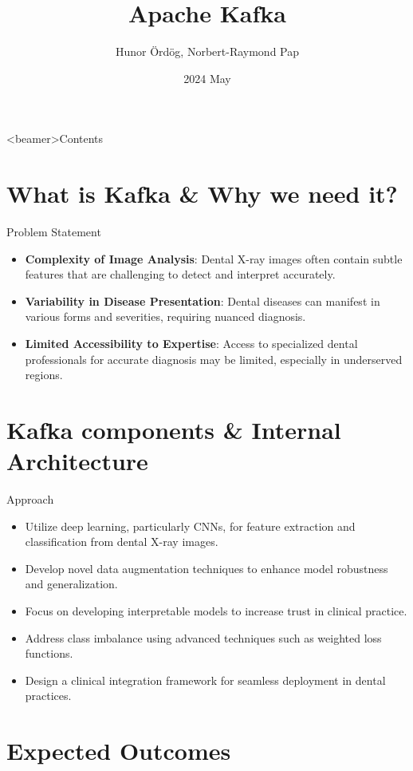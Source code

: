 \documentclass{beamer}
\title[Apache Kafka]{Apache Kafka}
\author{ Hunor Ördög, Norbert-Raymond Pap}
\institute[UBB Cluj-Napoca]{
  Department of Mathematics and Informatics\\
  Babe{\c{s}}--Bolyai University, Cluj-Napoca}
\date{2024 May}
\begin{document}
\frame{\maketitle}

{

  {
      \begin{frame}<beamer>{Contents}
        \tableofcontents
      \end{frame}
    }
}

\section[What is Kafka \& Why we need it?]{What is Kafka \& Why we need it?}

\begin{frame}{Problem Statement}
  \begin{itemize}
    \item \textbf{Complexity of Image Analysis}: Dental X-ray images often contain subtle features
          that are challenging to detect and interpret accurately.
    \item \textbf{Variability in Disease Presentation}: Dental diseases can manifest in various forms and severities,
          requiring nuanced diagnosis.
    \item \textbf{Limited Accessibility to Expertise}: Access to specialized dental professionals for
          accurate diagnosis may be limited, especially in underserved regions.
  \end{itemize}
\end{frame}


\section[Kafka components \& Internal Architecture]{Kafka components \& Internal Architecture}

\begin{frame}{Approach}
  \begin{itemize}
    \item Utilize deep learning, particularly CNNs, for feature extraction and classification from dental X-ray images.\cite{chen2021dental}
    \item Develop novel data augmentation techniques to enhance model robustness and generalization.\cite{lee2018detection}
    \item Focus on developing interpretable models to increase trust in clinical practice.\cite{setiabudi2017expert}
    \item Address class imbalance using advanced techniques such as weighted loss functions.\cite{litjens2017survey}
    \item Design a clinical integration framework for seamless deployment in dental practices.
  \end{itemize}
\end{frame}


\section[Expected Outcomes]{Expected Outcomes}
\end{document}
